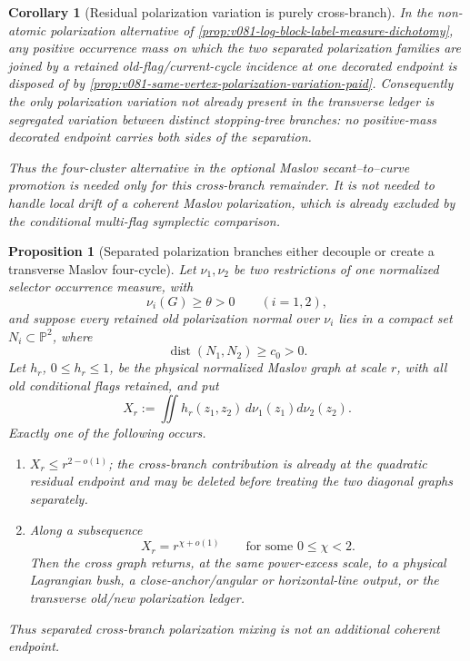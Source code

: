 \documentclass[10pt]{article}
\newtheorem{proposition}[theorem]{Proposition}
\newtheorem{corollary}[theorem]{Corollary}
\newcommand{\dist}{\operatorname{dist}}
\begin{document}
\begin{corollary}[Residual polarization variation is purely cross-branch]
\label{cor:v081-polarization-variation-cross-branch}
In the non-atomic polarization alternative of
\cref{prop:v081-log-block-label-measure-dichotomy}, any positive occurrence mass on which the two
separated polarization families are joined by a retained old-flag/current-cycle incidence at one
decorated endpoint is disposed of by
\cref{prop:v081-same-vertex-polarization-variation-paid}.  Consequently the only polarization
variation not already present in the transverse ledger is segregated variation between distinct
stopping-tree branches: no positive-mass decorated endpoint carries both sides of the separation.

Thus the four-cluster alternative in
the optional Maslov secant--to--curve promotion is needed only for this cross-branch remainder.  It is not needed
to handle local drift of a coherent Maslov polarization, which is already excluded by the
conditional multi-flag symplectic comparison.
\end{corollary}

\begin{proposition}[Separated polarization branches either decouple or create a transverse
Maslov four-cycle]
\label{prop:v081-cross-branch-polarization-decoupling}
Let \(\nu_1,\nu_2\) be two restrictions of one normalized selector occurrence measure, with
\[
\nu_i(G)\ge\theta>0
\qquad(i=1,2),
\]
and suppose every retained old polarization normal over \(\nu_i\) lies in a compact set
\(N_i\subset\mathbb P^2\), where
\[
\dist(N_1,N_2)\ge c_0>0.
\]
Let \(h_r\), \(0\le h_r\le1\), be the physical normalized Maslov graph at scale \(r\), with all old
conditional flags retained, and put
\[
X_r
:=
\iint h_r(z_1,z_2)\,d\nu_1(z_1)d\nu_2(z_2).
\]
Exactly one of the following occurs.
\begin{enumerate}[label=\textnormal{(\roman*)}]
\item \(X_r\le r^{2-o(1)}\); the cross-branch contribution is already at the quadratic residual
endpoint and may be deleted before treating the two diagonal graphs separately.
\item Along a subsequence
\[
X_r=r^{\chi+o(1)}
\qquad\text{for some }0\le\chi<2.
\]
Then the cross graph returns, at the same power-excess scale, to a physical Lagrangian bush, a
close-anchor/angular or horizontal-line output, or the transverse old/new polarization ledger.
\end{enumerate}
Thus separated cross-branch polarization mixing is not an additional coherent endpoint.
\end{proposition}
\end{document}
